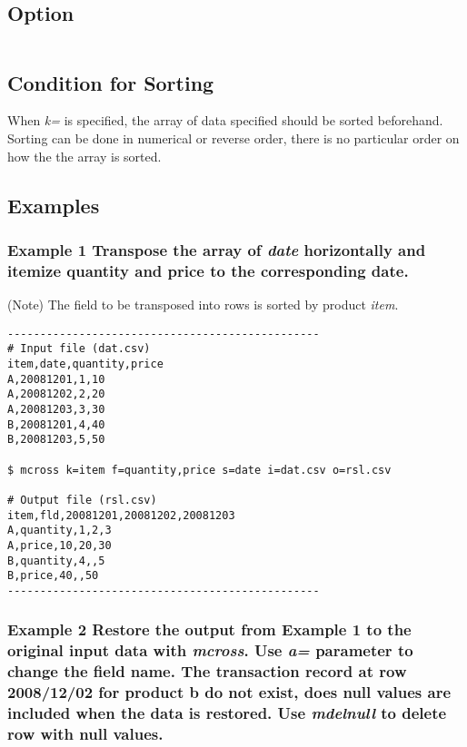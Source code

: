 \documentclass[a4paper]{jarticle}
\begin{document}
\subsection*{Option}
\begin{table}[htbp]
{\small
\begin{tabular}{ll}
\end{tabular} 
}
\end{table} 

\subsection*{Condition for Sorting }
When \emph{k=} is specified, the array of data specified should be sorted beforehand. Sorting can be done in numerical or reverse order, there is no particular order on how the the array is sorted. 

\subsection*{Examples}
\subsubsection*{Example 1 Transpose the array of \emph{date} horizontally and itemize quantity and price to the corresponding date.
}
(Note) The field to be transposed into rows is sorted by product \emph{item}. 

\begin{verbatim}
------------------------------------------------
# Input file (dat.csv)
item,date,quantity,price
A,20081201,1,10
A,20081202,2,20
A,20081203,3,30
B,20081201,4,40
B,20081203,5,50

$ mcross k=item f=quantity,price s=date i=dat.csv o=rsl.csv

# Output file (rsl.csv)
item,fld,20081201,20081202,20081203
A,quantity,1,2,3
A,price,10,20,30
B,quantity,4,,5
B,price,40,,50
------------------------------------------------
\end{verbatim}

\subsubsection*{Example 2  Restore the output from Example 1 to the original input data with  \emph{mcross}. Use \emph{a=} parameter to change the field name. 
The transaction record at row 2008/12/02 for product b do not exist, does null values are included when the data is restored. Use \emph{mdelnull} to delete row with null values. 
}
\end{document}
